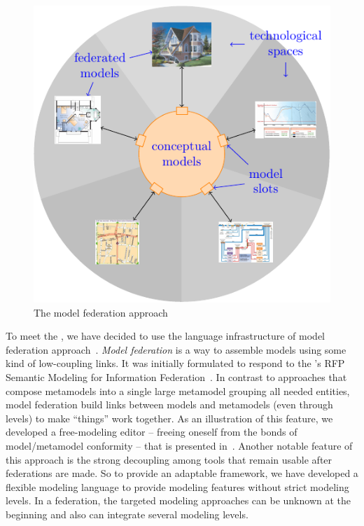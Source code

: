 

\begin{figure}[t]
    \centering
    \includegraphics[width=\columnwidth]{Figures/federation.pdf}
    \caption{The model federation approach}
    \label{fig:mf}
\end{figure}

To meet the \mlpc, we have decided to use the language infrastructure of
model federation approach~\parencite{Golra2016-federation}. \emph{Model
  federation} is a way to assemble models using some kind of
low-coupling links. It was initially  formulated to respond to the \OMG's RFP
Semantic Modeling for Information Federation~\parencite{simf}. In
contrast to approaches that compose metamodels into a single large
metamodel grouping all needed entities, model federation build links
between models and metamodels (even through levels) to make ``things''
work together. As an illustration of this feature, we developed a
free-modeling editor -- freeing oneself from the bonds of
model/metamodel conformity -- that is presented
in~\parencite{models2016-freemodel}. Another notable feature of
this approach is the strong decoupling among tools that remain usable
after federations are made.
So to provide an adaptable framework, we have developed a flexible modeling language to provide modeling features without strict modeling levels. In a federation, the targeted modeling approaches can be unknown at the beginning and also can integrate several modeling levels.


